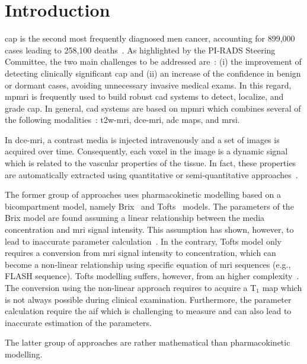 \section{Introduction}

\Ac{cap} is the second most frequently diagnosed men cancer, accounting for 899,000 cases leading to 258,100 deaths~\citep{ferlay2010estimates}.
As highlighted by the PI-RADS Steering Committee, the two main challenges to be addressed are~\citep{weinreb2016pi}:
(i) the improvement of detecting clinically significant \ac{cap} and
(ii) an increase of the confidence in benign or dormant cases, avoiding unnecessary invasive medical exams.
In this regard, \ac{mpmri} is frequently used to build robust \ac{cad} systems to detect, localize, and grade \ac{cap}.
In general, \ac{cad} systems are based on \ac{mpmri} which combines several of the following modalities~\citep{lemaitre2015computer}: \ac{t2w}-\ac{mri}, \ac{dce}-\ac{mri}, \ac{adc} maps, and \ac{mrsi}.

In \ac{dce}-\ac{mri}, a contrast media is injected intravenously and a set of images is acquired over time.
Consequently, each voxel in the image is a dynamic signal which is related to the vascular properties of the tissue.
In fact, these properties are automatically extracted using quantitative or semi-quantitative approaches~\citep{lemaitre2015computer}.

The former group of approaches uses pharmacokinetic modelling based on a bicompartment model, namely Brix~\citep{brix1991pharmacokinetic} and Tofts~\citep{tofts1995quantitative} models.
The parameters of the Brix model are found assuming a linear relationship between the media concentration and \ac{mri} signal intensity.
This assumption has shown, however, to lead to inaccurate parameter calculation~\citep{heilmann2006determination}.
In the contrary, Tofts model only requires a conversion from \ac{mri} signal intensity to concentration, which can become a non-linear relationship using specific equation of \ac{mri} sequences (e.g., FLASH sequence).
Tofts modelling suffers, however, from an higher complexity~\citep{gliozzi2011phenomenological}.
The conversion using the non-linear approach requires to acquire a T$_1$ map which is not always possible during clinical examination.
Furthermore, the parameter calculation require the \ac{aif} which is challenging to measure and can also lead to inaccurate estimation of the parameters.

The latter group of approaches are rather mathematical than pharmacokinetic modelling.


